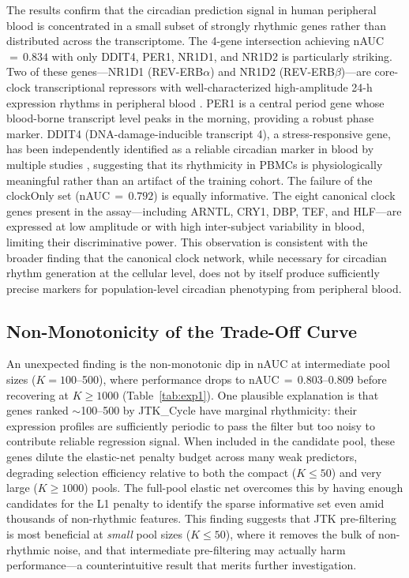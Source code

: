 \documentclass[10pt,a4paper]{article}
\begin{document}
The results confirm that the circadian prediction signal in human
peripheral blood is concentrated in a small subset of strongly
rhythmic genes rather than distributed across the transcriptome.
The 4-gene intersection achieving nAUC\,${=}\,0.834$ with only DDIT4,
PER1, NR1D1, and NR1D2 is particularly striking.
Two of these genes---NR1D1 (REV-ERB$\alpha$) and NR1D2
(REV-ERB$\beta$)---are core-clock transcriptional repressors with
well-characterized high-amplitude 24-h expression rhythms in
peripheral blood \citep{Reppert2002}.
PER1 is a central period gene whose blood-borne transcript level
peaks in the morning, providing a robust phase marker.
DDIT4 (DNA-damage-inducible transcript 4), a stress-responsive gene,
has been independently identified as a reliable circadian marker in
blood by multiple studies \citep{Braun2018, Huang2024}, suggesting
that its rhythmicity in PBMCs is physiologically meaningful rather
than an artifact of the training cohort.
The failure of the clockOnly set (nAUC\,${=}\,0.792$) is equally
informative.
The eight canonical clock genes present in the assay---including
ARNTL, CRY1, DBP, TEF, and HLF---are expressed at low amplitude
or with high inter-subject variability in blood, limiting their
discriminative power.
This observation is consistent with the broader finding that the
canonical clock network, while necessary for circadian rhythm
generation at the cellular level, does not by itself produce
sufficiently precise markers for population-level circadian
phenotyping from peripheral blood.

\subsection{Non-Monotonicity of the Trade-Off Curve}

An unexpected finding is the non-monotonic dip in nAUC at
intermediate pool sizes ($K = 100$--500), where performance drops
to nAUC\,${=}\,0.803$--0.809 before recovering at $K \geq 1000$
(Table~\ref{tab:exp1}).
One plausible explanation is that genes ranked ${\sim}$100--500 by
JTK\_Cycle have marginal rhythmicity: their expression profiles are
sufficiently periodic to pass the filter but too noisy to contribute
reliable regression signal.
When included in the candidate pool, these genes dilute the
elastic-net penalty budget across many weak predictors, degrading
selection efficiency relative to both the compact ($K \leq 50$) and
very large ($K \geq 1000$) pools.
The full-pool elastic net overcomes this by having enough candidates
for the L1 penalty to identify the sparse informative set even amid
thousands of non-rhythmic features.
This finding suggests that JTK pre-filtering is most beneficial at
\emph{small} pool sizes ($K \leq 50$), where it removes the bulk of
non-rhythmic noise, and that intermediate pre-filtering may actually
harm performance---a counterintuitive result that merits further
investigation.
\end{document}
